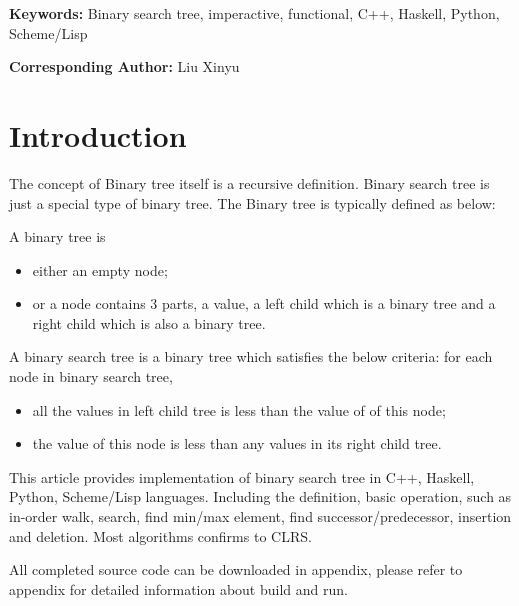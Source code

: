 \documentclass{article}
\begin{document}
\vspace{3cm}
{\bfseries Keywords:} Binary search tree, imperactive, functional, C++, Haskell, Python, Scheme/Lisp

{\bfseries Corresponding Author:} Liu Xinyu

\maketitle

\section{Introduction}
\label{introduction}

The concept of Binary tree itself is a recursive definition. Binary search tree is just a special type of
binary tree. The Binary tree is typically defined as below:

A binary tree is 
\begin{itemize}
\item either an empty node;
\item or a node contains 3 parts, a value, a left child which is a binary tree and a right child which is also a binary tree.
\end{itemize}

A binary search tree is a binary tree which satisfies the below criteria:
for each node in binary search tree,
\begin{itemize}
\item all the values in left child tree is less than the value of of this node;
\item the value of this node is less than any values in its right child tree.
\end{itemize}

This article provides implementation of binary search tree in C++, Haskell, Python, 
Scheme/Lisp languages. Including the definition, basic operation, such as
in-order walk, search, find min/max element, find successor/predecessor, insertion
and deletion. Most algorithms confirms to CLRS\cite{CLRS}.

All completed source code can be downloaded in appendix, please refer to appendix
for detailed information about build and run.

\end{document}
